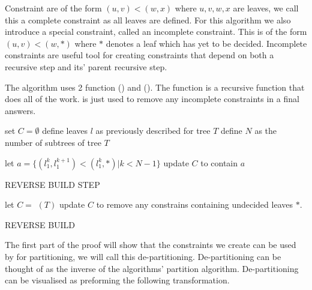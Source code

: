 Constraint are of the form $(u,v)<(w,x)$ where $u,v,w,x$ are leaves, we call this a complete constraint as all leaves are defined. For this algorithm we also introduce a special constraint, called an incomplete constraint. This is of the form $(u, v)<(w, *)$ where $*$ denotes a leaf which has yet to be decided. Incomplete constraints are useful tool for creating constraints that depend on both a recursive step and its' parent recursive step.  


The  algorithm uses 2 function  () and  (). The  function is a recursive function that does all of the work.  is just used to remove any incomplete constraints in a final answers.

\begin{algorithm}[H]
    \LinesNumbered
    \SetAlgoLined
     set $C=\emptyset$\;
     define leaves $l$ as previously described for tree $T$\;
     define $N$ as the number of subtrees of tree $T$\;
     
     let $a = \{(l_1^k, l_1^{k+1}) < (l_1^k, *)|k<N-1\}$\label{alg:make}\;
     update $C$ to contain $a$\;
    
     \caption{REVERSE BUILD STEP}
\end{algorithm}

\begin{algorithm}[H]
    \SetAlgoLined
     
    let $C=$ $(T)$\;
    update $C$ to remove any constrains containing undecided leaves $*$.
     
     \caption{REVERSE BUILD}
\end{algorithm}



 The first part of the proof will show that the constraints we create can be used by  for partitioning, we will call this de-partitioning. De-partitioning can be thought of as the inverse of the  algorithms' partition algorithm. De-partitioning can be visualised as preforming the following transformation.\\
 
